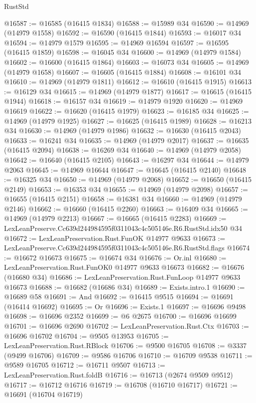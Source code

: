 \begin{lexlean}{RustStd}
\begin{coremodule}
@16587 := @16585 (@16415 @1834)
@16588 := @15989 @34
@16590 := @14969 (@14979 @1558)
@16592 := @16590 (@16415 @1844)
@16593 := @16017 @34
@16594 := @14979 @1579
@16595 := @14969 @16594
@16597 := @16595 (@16415 @1859)
@16598 := @16045 @34
@16600 := @14969 (@14979 @1584)
@16602 := @16600 (@16415 @1864)
@16603 := @16073 @34
@16605 := @14969 (@14979 @1658)
@16607 := @16605 (@16415 @1884)
@16608 := @16101 @34
@16610 := @14969 (@14979 @1811)
@16612 := @16610 (@16415 @1915)
@16613 := @16129 @34
@16615 := @14969 (@14979 @1877)
@16617 := @16615 (@16415 @1944)
@16618 := @16157 @34
@16619 := @14979 @1920
@16620 := @14969 @16619
@16622 := @16620 (@16415 @1979)
@16623 := @16185 @34
@16625 := @14969 (@14979 @1925)
@16627 := @16625 (@16415 @1989)
@16628 := @16213 @34
@16630 := @14969 (@14979 @1986)
@16632 := @16630 (@16415 @2043)
@16633 := @16241 @34
@16635 := @14969 (@14979 @2017)
@16637 := @16635 (@16415 @2094)
@16638 := @16269 @34
@16640 := @14969 (@14979 @2058)
@16642 := @16640 (@16415 @2105)
@16643 := @16297 @34
@16644 := @14979 @2063
@16645 := @14969 @16644
@16647 := @16645 (@16415 @2140)
@16648 := @16325 @34
@16650 := @14969 (@14979 @2068)
@16652 := @16650 (@16415 @2149)
@16653 := @16353 @34
@16655 := @14969 (@14979 @2098)
@16657 := @16655 (@16415 @2151)
@16658 := @16381 @34
@16660 := @14969 (@14979 @2146)
@16662 := @16660 (@16415 @2260)
@16663 := @16409 @34
@16665 := @14969 (@14979 @2213)
@16667 := @16665 (@16415 @2283)
@16669 := LexLeanPreserve.Cc639d244984595f0311043c4c505146e.R6.RustStd.idx50 @34
@16672 := LexLeanPreservation.Rust.FunOK @14977 @9633
@16673 := LexLeanPreserve.Cc639d244984595f0311043c4c505146e.R6.RustStd.flags
@16674 := @16672 @16673
@16675 := @16674 @34
@16676 := Or.inl
@16680 := LexLeanPreservation.Rust.FunOK0 @14977 @9633 @16673
@16682 := @16676 (@16680 @34)
@16686 := LexLeanPreservation.Rust.FunLoop @14977 @9633 @16673
@16688 := @16682 (@16686 @34)
@16689 := Exists.intro.{1}
@16690 := @16689 @58
@16691 := And
@16692 := @16415 @9515
@16694 := @16691 (@16414 @16692)
@16695 := Or
@16696 := Exists.{1}
@16697 := @16696 @9498
@16698 := @16696 @2352
@16699 := @6 @2675
@16700 := @16696 @16699
@16701 := @16696 @2690
@16702 := LexLeanPreservation.Rust.Ctx
@16703 := @16696 @16702
@16704 := @9505 @13953
@16705 := LexLeanPreservation.Rust.RBlock
@16706 := @9500 @16705
@16708 := @3337 (@9499 @16706)
@16709 := @9586 @16706
@16710 := @16709 @9538
@16711 := @9589 @16705
@16712 := @16711 @9507
@16713 := LexLeanPreservation.Rust.foldB
@16716 := @16713 (@2674 @9509 @9512)
@16717 := @16712 @16716
@16719 := @16708 (@16710 @16717)
@16721 := @16691 (@16704 @16719)

\end{coremodule}
\end{lexlean}

